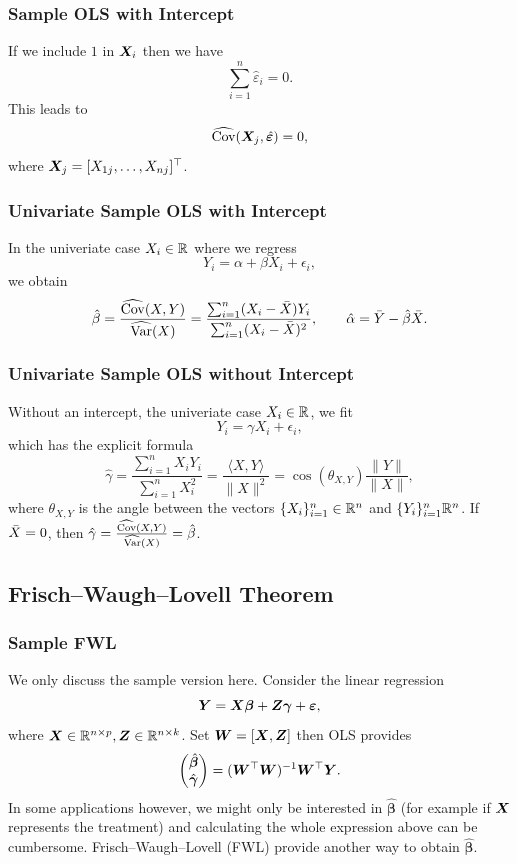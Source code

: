 \documentclass[11pt]{exam}
\begin{document}
\subsubsection{Sample OLS with Intercept}
If we include $1$ in $\bm{X}_i$ then we have 
\[
    \sum_{i=1}^n \hat{\varepsilon}_i = 0.
\]
This leads to 
\[
 \widehat{\mathrm{Cov}}(\bm{X}_j, \hat{\bm{\varepsilon}}) = 0,
\]
where $\bm{X}_j = [X_{1j}, \ldots, X_{nj}]^\top$.

\subsubsection{Univariate Sample OLS with Intercept}\label{sec:univeriate_sample_ols_intercept}
In the univeriate case $X_i \in \mathbb{R}$ where we regress
\[
    Y_i = \alpha + \beta X_i + \epsilon_i,
\]
we obtain
\[
    \hat \beta = \frac{\widehat{\mathrm{Cov}}(X, Y)}{\widehat{\mathrm{Var}}(X)} = \frac{\sum_{i=1}^n (X_i - \Bar{X}) Y_i}{\sum_{i=1}^n (X_i - \Bar{X})^2}, \qquad \hat \alpha = \Bar{Y} - \hat \beta \Bar{X}.
\]

\subsubsection{Univariate Sample OLS without Intercept}
Without an intercept, the univeriate case $X_i \in \mathbb{R}$, we fit
\[
    Y_i = \gamma X_i + \epsilon_i,
\]
which has the explicit formula
\[
    \hat \gamma = \frac{\sum_{i=1}^n X_i Y_i}{\sum_{i=1}^n X_i^2} = \frac{\langle X,Y\rangle}{\|X\|^2} = \cos{(\theta_{X, Y})} \frac{\|Y\|}{\|X\|},
\]
where $\theta_{X, Y}$ is the angle between the vectors $\{X_i\}_{i=1}^n \in \mathbb{R}^n$ and $\{Y_i\}_{i=1}^n \mathbb{R}^n$.
If $\Bar{X} = 0$, then $\hat \gamma = \frac{\widehat{\mathrm{Cov}}(X, Y)}{\widehat{\mathrm{Var}}(X)} = \hat \beta$.

\subsection{Frisch–Waugh–Lovell Theorem}
\subsubsection{Sample FWL}\label{thm:fwl}
We only discuss the sample version here. Consider the linear regression
\[
     \bm{Y} = \bm{X} \bm{\beta} + \bm{Z} \bm{\gamma} + \bm{\varepsilon},
\]
where $\bm{X} \in \mathbb{R}^{n \times p}, \bm{Z} \in \mathbb{R}^{n \times k}$. Set $\bm{W} = [\bm{X}, \bm{Z}]$ then OLS provides
\[
    \begin{pmatrix}
  \hat{\bm{\beta}} \\ \hat{\bm{\gamma}} 
  \end{pmatrix} = (\bm{W}^\top \bm{W})^{-1} \bm{W}^\top \bm{Y}.
\]
In some applications however, we might only be interested in $\hat{\bm{\beta}}$ (for example if $\bm{X}$ represents the treatment) and calculating the whole expression above can be cumbersome. Frisch–Waugh–Lovell (FWL) provide another way to obtain $\hat{\bm{\beta}}$.
\end{document}
